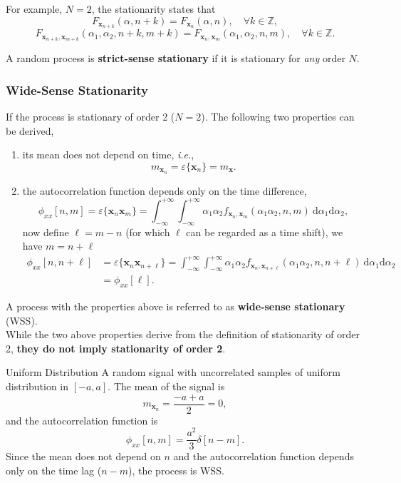 For example, $N=2$, the stationarity states that 
\[
    F_{\mathbf{x}_{n+k}}(\alpha, n+k) = F_{\mathbf{x}_{n}}(\alpha, n), \quad \forall k \in \mathbb{Z},
\]
\[
    F_{\mathbf{x}_{n+k}, \mathbf{x}_{m+k}}(\alpha_1, \alpha_2, n+k, m+k) = F_{\mathbf{x}_{n}, \mathbf{x}_{m}}(\alpha_1, \alpha_2, n, m), \quad \forall k \in \mathbb{Z}.
\]

A random process is \textbf{strict-sense stationary} if it is stationary for \textit{any} order $N$.

\subsubsection{Wide-Sense Stationarity}
If the process is stationary of order 2 ($N=2$). The following two properties can be derived,
\begin{enumerate}
    \item its mean does not depend on time, \textit{i.e.},
        \[
            m_{\mathbf{x}_n} = \varepsilon\{\mathbf{x}_n\} = m_{\mathbf{x}}.
        \]
    \item the autocorrelation function depends only on the time difference, 
        \[
            \phi_{xx}[n, m] = \varepsilon\{ \mathbf{x}_n \mathbf{x}_m \} = \int_{-\infty}^{+\infty} \int_{-\infty}^{+\infty} \alpha_1 \alpha_2 f_{\mathbf{x}_n, \mathbf{x}_m} (\alpha_1 \alpha_2, n, m) \ \mathrm{d}\alpha_1 \mathrm{d}\alpha_2,
        \]
        now define $\ell = m-n$ (for which $\ell$ can be regarded as a time shift), we have $m = n + \ell$ 
        \begin{align*}
            \phi_{xx}[n, n+\ell]
            & = \varepsilon\{ \mathbf{x}_n \mathbf{x}_{n+\ell} \} = \int_{-\infty}^{+\infty} \int_{-\infty}^{+\infty} \alpha_1 \alpha_2 f_{\mathbf{x}_n, \mathbf{x}_{n+\ell}} (\alpha_1 \alpha_2, n, {n+\ell}) \ \mathrm{d}\alpha_1 \mathrm{d}\alpha_2\\
            & = \phi_{xx}[\ell].
        \end{align*}
\end{enumerate}
A process with the properties above is referred to as \textbf{wide-sense stationary} (WSS).\\

While the two above properties derive from the definition of stationarity of order 2, \textbf{they do not imply stationarity of order 2}.

\begin{ex}{Uniform Distribution}
A random signal with uncorrelated samples of uniform distribution in $[−a, a]$. The mean of the signal is
\[
    m_{\mathbf{x}_n} = \frac{-a + a}{2} = 0,
\]
and the autocorrelation function is
\[
    \phi_{xx}[n,m] = \frac{a^2}{3} \delta[n-m].
\]
Since the mean does not depend on $n$ and the autocorrelation function depends only on the time lag ($n-m$), the process is WSS.
\end{ex}

